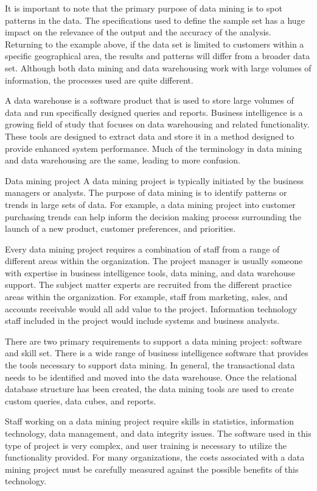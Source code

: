 It is important to note that the primary purpose of data mining is to spot patterns in the data. The specifications used to define the sample set has a huge impact on the relevance of the output and the accuracy of the analysis. Returning to the example above, if the data set is limited to customers within a specific geographical area, the results and patterns will differ from a broader data set. Although both data mining and data warehousing work with large volumes of information, the processes used are quite different.

A data warehouse is a software product that is used to store large volumes of data and run specifically designed queries and reports. Business intelligence is a growing field of study that focuses on data warehousing and related functionality. These tools are designed to extract data and store it in a method designed to provide enhanced system performance. Much of the terminology in data mining and data warehousing are the same, leading to more confusion.

Data mining project
A data mining project is typically initiated by the business managers or analysts. The purpose of data mining is to identify patterns or trends in large sets of data. For example, a data mining project into customer purchasing trends can help inform the decision making process surrounding the launch of a new product, customer preferences, and priorities.

Every data mining project requires a combination of staff from a range of different areas within the organization. The project manager is usually someone with expertise in business intelligence tools, data mining, and data warehouse support. The subject matter experts are recruited from the different practice areas within the organization. For example, staff from marketing, sales, and accounts receivable would all add value to the project. Information technology staff included in the project would include systems and business analysts.

There are two primary requirements to support a data mining project: software and skill set. There is a wide range of business intelligence software that provides the tools necessary to support data mining. In general, the transactional data needs to be identified and moved into the data warehouse. Once the relational database structure has been created, the data mining tools are used to create custom queries, data cubes, and reports.

Staff working on a data mining project require skills in statistics, information technology, data management, and data integrity issues. The software used in this type of project is very complex, and user training is necessary to utilize the functionality provided. For many organizations, the costs associated with a data mining project must be carefully measured against the possible benefits of this technology.

